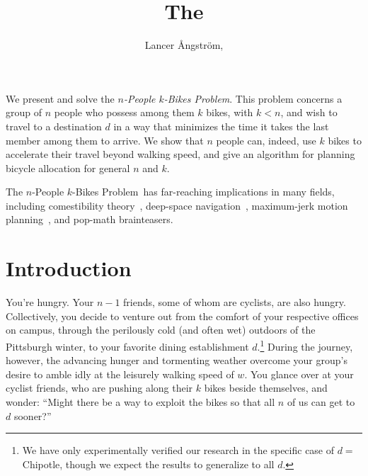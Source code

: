\documentclass[DIV=calc, paper=a4, fontsize=11pt, twocolumn]{scrartcl}	 %
\title{The \Prob} %
\author{Lancer \r{A}ngstr\"{o}m, } %
\date{} %
\newcommand{\initial}[1]{ %
\lettrine[lines=3,lhang=0.3,nindent=0em]{
\color{DarkGoldenrod}
{\textsf{#1}}}{}}
\newcommand\prob{$n$-People $k$-Bikes Problem}
\begin{document}
\maketitle %




\initial{W}e present and solve the {\em \prob}. This problem concerns a group of $n$ people who possess among them $k$ bikes, with $k<n$, and wish to travel to a destination $d$ in a way that minimizes the time it takes the last member among them to arrive. We show that $n$ people can, indeed, use $k$ bikes to accelerate their travel beyond walking speed, and give an algorithm for planning bicycle allocation for general $n$ and $k$.

The \prob~has far-reaching implications in many fields, including comestibility theory~\cite{comestibility}, deep-space navigation~\cite{arkanoid}, maximum-jerk motion planning~\cite{jerk2}, and pop-math brainteasers.


\section{Introduction}

\initial{Y}ou're hungry. Your $n-1$ friends, some of whom are cyclists, are also hungry. Collectively, you decide to venture out from the comfort of your respective offices on campus, through the perilously cold (and often wet) outdoors of the Pittsburgh winter, to your favorite dining establishment $d$.\footnote{
We have only experimentally verified our research in the specific case of $d =$ {\sf Chipotle}, though we expect the results to generalize to all $d$.}
During the journey, however, the advancing hunger and tormenting weather overcome your group's desire to amble idly at the leisurely walking speed of $w$.
You glance over at your cyclist friends, who are pushing along their $k$ bikes beside themselves, and wonder: ``Might there be a way to exploit the bikes so that all $n$ of us can get to $d$ sooner?''
\end{document}
